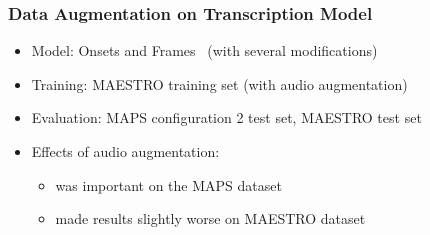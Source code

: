 \documentclass[dvipdfmx]{beamer}
\begin{document}
\begin{frame}[noframenumbering]
    \frametitle{Data Augmentation on Transcription Model}
    \begin{itemize}
        \item Model: Onsets and Frames \cite{onsetandframes} \ {\small (with several modifications)}
        \item Training: MAESTRO training set (with audio augmentation)
        \item Evaluation: MAPS configuration 2 test set, MAESTRO test set
    \end{itemize}
    \begin{itemize}
        \item Effects of audio augmentation:
        \begin{itemize}
            \item was important on the MAPS dataset
            \item made results slightly worse on MAESTRO dataset
        \end{itemize}
    \end{itemize}
\end{frame}
\end{document}
